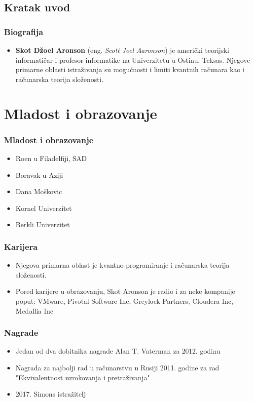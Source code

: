 \documentclass{beamer}
\def\dJ{{\fontencoding{T1}\selectfont\dj}}
\begin{document}
\subsection{Kratak uvod}
\begin{frame}[fragile]
    \frametitle{Biografija}
	\begin{itemize}
		\item \textbf{Skot Džoel Aronson} (eng. \textit{Scott Joel Aaronson}) je američki teorijski informatičar i profesor informatike na Univerzitetu u Ostinu, Teksas. Njegove primarne oblasti istraživanja su mogućnosti i limiti kvantnih računara kao i računarska teorija složenosti.
	\end{itemize}
\end{frame}
\section{Mladost i obrazovanje}
\begin{frame}
	\frametitle{Mladost i obrazovanje} 
	\begin{itemize}
	    \item Ro\dJ{}en u Filadelfiji, SAD
	    \item Boravak u Aziji
	    \item Dana Moškovic
	    \item Kornel Univerzitet
	    \item Berkli Univerzitet
	    
	\end{itemize}
\end{frame}


\begin{frame}[fragile]\frametitle{Karijera}
	\begin{itemize}	
		\item Njegova primarna oblast je kvantno programiranje i računarska teorija složenosti.
		\item Pored karijere u obrazovanju, Skot Aronson je radio i za neke kompanije poput: VMware, Pivotal Software Inc, Greylock Partners, Cloudera Inc, Medallia Inc
	\end{itemize}
\end{frame}

\begin{frame}[fragile]\frametitle{Nagrade}
	\begin{itemize}	
		\item Jedan od dva dobitnika nagrade Alan T. Vaterman za 2012. godinu
		\item Nagrada za najbolji rad u računarstvu u Rusiji 2011. godine za rad "Ekvivalentnost uzrokovanja i pretraživanja"
		\item 2017. Simons istražitelj
	\end{itemize}
\end{frame}
\end{document}
